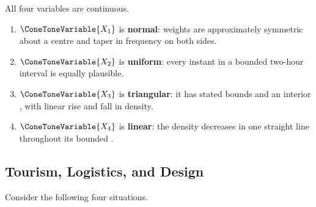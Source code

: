 	All four variables are continuous.
	\begin{enumerate}
		\item $\ConeToneVariable{X_1}$ is \textbf{normal}: weights are approximately symmetric about a centre and taper in frequency on both sides.
		\item $\ConeToneVariable{X_2}$ is \textbf{uniform}: every instant in a bounded two-hour interval is equally plausible.
		\item $\ConeToneVariable{X_3}$ is \textbf{triangular}: it has stated bounds and an interior , with linear rise and fall in density.
		\item $\ConeToneVariable{X_4}$ is \textbf{linear}: the density decreases in one straight line throughout its bounded .
	\end{enumerate}


	\subsection{Tourism, Logistics, and Design}
	\label{sec:tourism-logistics-design}

	Consider the following four situations.

